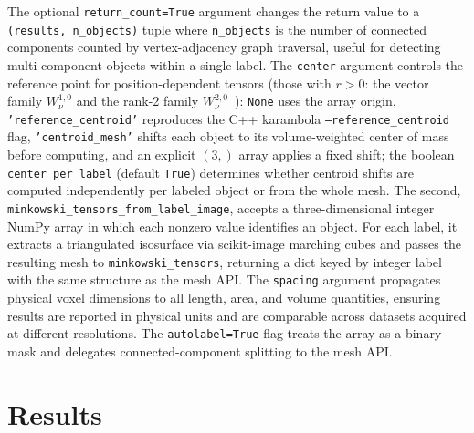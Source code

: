 \documentclass[unnumsec,webpdf,contemporary,large,namedate]{oup-authoring-template}
\begin{document}
The optional \texttt{return\_count=True} argument changes the return value to a \texttt{(results, n\_objects)} tuple where \texttt{n\_objects} is the number of connected components counted by vertex-adjacency graph traversal, useful for detecting multi-component objects within a single label.
The \texttt{center} argument controls the reference point for position-dependent tensors (those with $r > 0$: the vector family $W_\nu^{1,0}$ and the rank-2 family $W_\nu^{2,0}$~\citep{SchroderTurk2013}): \texttt{None} uses the array origin, \texttt{'reference\_centroid'} reproduces the C++ karambola \texttt{--reference\_centroid} flag, \texttt{'centroid\_mesh'} shifts each object to its volume-weighted center of mass before computing, and an explicit $(3,)$ array applies a fixed shift; the boolean \texttt{center\_per\_label} (default \texttt{True}) determines whether centroid shifts are computed independently per labeled object or from the whole mesh.
The second, \texttt{minkowski\_tensors\_from\_label\_image}, accepts a three-dimensional integer NumPy array in which each nonzero value identifies an object.
For each label, it extracts a triangulated isosurface via scikit-image marching cubes and passes the resulting mesh to \texttt{minkowski\_tensors}, returning a dict keyed by integer label with the same structure as the mesh API.
The \texttt{spacing} argument propagates physical voxel dimensions to all length, area, and volume quantities, ensuring results are reported in physical units and are comparable across datasets acquired at different resolutions.
The \texttt{autolabel=True} flag treats the array as a binary mask and delegates connected-component splitting to the mesh API.


\section{Results}
\end{document}
